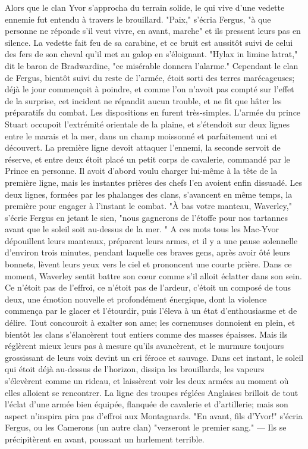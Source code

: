 {Alors que le clan Yvor s'approcha du terrain solide, le qui vive d'une vedette ennemie fut entendu à travers le brouillard. "Paix," s'écria Fergus, "à que personne ne réponde s'il veut vivre, en avant, marche" et ils pressent leurs pas en silence.
La vedette fait feu de sa carabine, et ce bruit est aussitôt suivi de celui des fers de son cheval qu'il met au galop en s'éloignant.\setcounter{page}{243} "Hylax in limine latrat," dit le baron de Bradwardine, "ce misérable donnera l'alarme."
Cependant le clan de Fergus, bientôt suivi du reste de l'armée, étoit sorti des terres marécageuses; déjà le jour commençoit à poindre, et comme l'on n'avoit pas compté sur l'effet de la surprise, cet incident ne répandit aucun trouble, et ne fit que hâter les préparatifs du combat.
Les dispositions en furent très-simples. L'armée du prince Stuart occupoit l'extrémité orientale de la plaine, et s'étendoit sur deux lignes entre le marais et la mer, dans un champ moissonné et parfaitement uni et découvert. La première ligne devoit attaquer l'ennemi, la seconde servoit de réserve, et entre deux étoit placé un petit corps de cavalerie, commandé par le Prince en personne. Il avoit d'abord voulu charger lui-même à la tête de la première ligne, mais les instantes prières des chefs l'en avoient enfin dissuadé.
Les deux lignes, formées par les phalanges des clans, s'avancent en même temps, la première pour engager à l'instant le combat. "À bas votre manteau, Waverley," s'écrie Fergus en jetant le sien, "nous gagnerons de l'étoffe pour nos tartannes avant que le soleil\setcounter{page}{244} soit au-dessus de la mer. " A ces mots tous les Mac-Yvor dépouillent leurs manteaux, préparent leurs armes, et il y a une pause solennelle d'environ trois minutes, pendant laquelle ces braves gens, après avoir ôté leurs bonnets, lèvent leurs yeux vers le ciel et prononcent une courte prière. Dans ce moment, Waverley sentit battre son cœur comme s'il alloit éclatter dans son sein. Ce n'étoit pas de l'effroi, ce n'étoit pas de l'ardeur, c'étoit un composé de tous deux, une émotion nouvelle et profondément énergique, dont la violence commença par le glacer et l'étourdir, puis l'éleva à un état d'enthousiasme et de délire. Tout concouroit à exalter son ame; les cornemuses donnoient en plein, et bientôt les clans s'élancèrent tout entiers comme des masses épaisses. Mais ils réglèrent mieux leurs pas à mesure qu'ils avancèrent, et le murmure toujours grossissant de leurs voix devint un cri féroce et sauvage.
Dans cet instant, le soleil qui étoit déjà au-dessus de l'horizon, dissipa les brouillards, les vapeurs s'élevèrent comme un rideau, et laissèrent voir les deux armées au moment où elles alloient se rencontrer. La ligne des troupes réglées Anglaises brilloit de tout l'éclat d'une armée bien équipée, flanquée de cavalerie et d'artillerie; mais son aspect n'inspira\setcounter{page}{245} pira pas d'effroi aux Montagnards. "En avant, fils d'Yvor!" s'écria Fergus, ou les Camerons (un autre clan) "verseront le premier sang." — Ils se précipitèrent en avant, poussant un hurlement terrible.
}
